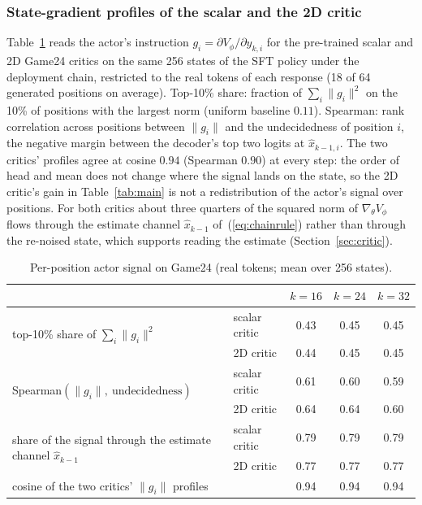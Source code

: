\iffalse
\subsubsection{State-gradient profiles of the scalar and the 2D critic}
\label{app:actor_signal}
Table~\ref{tab:actor_signal} reads the actor's instruction $g_i=\partial V_\phi/\partial y_{k,i}$ for the pre-trained scalar and 2D Game24 critics on the same 256 states of the SFT policy under the deployment chain, restricted to the real tokens of each response (18 of 64 generated positions on average). Top-10\% share: fraction of $\sum_i\|g_i\|^2$ on the 10\% of positions with the largest norm (uniform baseline $0.11$). Spearman: rank correlation across positions between $\|g_i\|$ and the undecidedness of position $i$, the negative margin between the decoder's top two logits at $\hat x_{k-1,i}$. The two critics' profiles agree at cosine $0.94$ (Spearman $0.90$) at every step: the order of head and mean does not change where the signal lands on the state, so the 2D critic's gain in Table~\ref{tab:main} is not a redistribution of the actor's signal over positions. For both critics about three quarters of the squared norm of $\nabla_{\theta}V_\phi$ flows through the estimate channel $\hat x_{k-1}$ of~(\ref{eq:chainrule}) rather than through the re-noised state, which supports reading the estimate (Section~\ref{sec:critic}).
\begin{table}[H]\centering\small
\caption{Per-position actor signal on Game24 (real tokens; mean over 256 states).}\label{tab:actor_signal}
\begin{tabular}{@{}llccc@{}}\toprule
 & & $k=16$ & $k=24$ & $k=32$\\\midrule
\multirow{2}{*}{top-10\% share of $\sum_i\|g_i\|^2$} & scalar critic & 0.43 & 0.45 & 0.45\\
 & 2D critic & 0.44 & 0.45 & 0.45\\\midrule
\multirow{2}{*}{Spearman$(\|g_i\|,\ \text{undecidedness})$} & scalar critic & 0.61 & 0.60 & 0.59\\
 & 2D critic & 0.64 & 0.64 & 0.60\\\midrule
\multirow{2}{*}{share of the signal through the estimate channel $\hat x_{k-1}$} & scalar critic & 0.79 & 0.79 & 0.79\\
 & 2D critic & 0.77 & 0.77 & 0.77\\\midrule
cosine of the two critics' $\|g_i\|$ profiles & & 0.94 & 0.94 & 0.94\\\bottomrule\end{tabular}\end{table}

